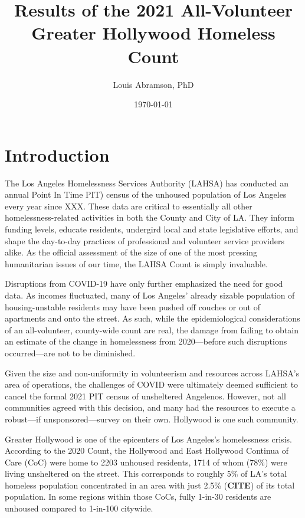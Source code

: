 \documentclass[11pt]{article}
\title{\bf
	Results of the 2021 All-Volunteer Greater Hollywood Homeless Count
	}
\author[*,$\dagger$,$\ddagger$]{Louis Abramson, PhD}%
\affil[*]{\it Hollywood 4WRD Homelessness Coalition}
\affil[$\dagger$]{\it Central Hollywood Neighborhood Council}
\affil[$\ddagger$]{\it Observatories of the Carnegie Institution for Science}%
\affil[ ]{\href{mailto:labramson.chnc@gmail.com}{labramson.chnc@gmail.com}}
\date{\today}                                           %
\def\bfr{\bf\color{red}}
\begin{document}
\maketitle

\begin{abstract}

\end{abstract}

\section{Introduction}
\label{sec:intro}

The Los Angeles Homelessness Services Authority (LAHSA) has conducted an annual Point In Time PIT) 
census of the unhoused population of Los Angeles every year since XXX. These data are critical to essentially
all other homelessness-related activities in both the County and City of LA. They inform funding levels, 
educate residents, undergird local and state legislative efforts, and shape the day-to-day practices of professional
and volunteer service providers alike. As the official assessment of the size of one of the most pressing 
humanitarian issues of our time, the LAHSA Count is simply invaluable.

Disruptions from COVID-19 have only further emphasized the need for good data. As incomes fluctuated,
many of Los Angeles' already sizable population of housing-unstable residents may have been pushed off
couches or out of apartments and onto the street. As such, while the epidemiological considerations of 
an all-volunteer, county-wide count are real, the damage from failing to obtain an estimate of the change
in homelessness from 2020---before such disruptions occurred---are not to be diminished.

Given the size and non-uniformity in volunteerism and resources across LAHSA's area of operations, 
the challenges of COVID were ultimately deemed sufficient to cancel the formal 2021 PIT census of 
unsheltered Angelenos. However, not all communities agreed with this decision, and many had the resources
to execute a robust---if unsponsored---survey on their own. Hollywood is one such community.

Greater Hollywood is one of the epicenters of Los Angeles's homelessness crisis. According to the 2020 
Count, the Hollywood and East Hollywood Continua of Care (CoC) were home to 2203 unhoused residents,
1714 of whom (78\%) were living unsheltered on the street. This corresponds to roughly 5\% of LA's total 
homeless population concentrated in an area with just 2.5\% ({\bfr CITE}) of its total
population. In some regions within those CoCs, fully 1-in-30 residents are unhoused compared to 1-in-100
citywide.
\end{document}
